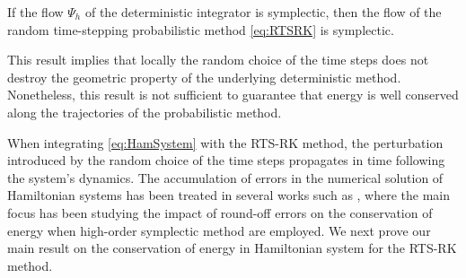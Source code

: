 \documentclass[10pt]{article}
\begin{document}
\begin{lemma}\label{lem:SympRTSRK} If the flow $\Psi_h$ of the deterministic integrator is symplectic, then the flow of the random time-stepping probabilistic method \eqref{eq:RTSRK} is symplectic.
\end{lemma}
This result implies that locally the random choice of the time steps does not destroy the geometric property of the underlying deterministic method. Nonetheless, this result is not sufficient to guarantee that energy is well conserved along the trajectories of the probabilistic method.

When integrating \eqref{eq:HamSystem} with the RTS-RK method, the perturbation introduced by the random choice of the time steps propagates in time following the system's dynamics. The accumulation of errors in the numerical solution of Hamiltonian systems has been treated in several works such as \cite{HMR08, Vil08b}, where the main focus has been studying the impact of round-off errors on the conservation of energy when high-order symplectic method are employed. We next prove our main result on the conservation of energy in Hamiltonian system for the RTS-RK method.
\end{document}
